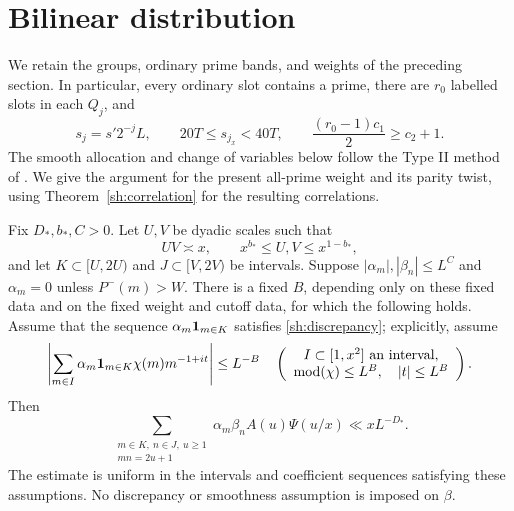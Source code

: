 \section{Bilinear distribution}\label{ti:section}

We retain the groups, ordinary prime bands, and weights of the preceding
section. In particular, every ordinary slot contains a prime, there are
$r_0$ labelled slots in each $Q_j$, and
\[
 s_j=s'2^{-j}L,\qquad 20T\le s_{j_x}<40T,\qquad
 \frac{(r_0-1)c_1}{2}\ge c_2+1.
\]
The smooth allocation and change of variables below follow the Type II
method of \cite{SmoothShifted}. We give the argument for the present
all-prime weight and its parity twist, using
Theorem~\ref{sh:correlation} for the resulting correlations.

\begin{theorem}\label{ti:distribution}
Fix $D_*,b_*,C>0$. Let $U,V$ be dyadic scales such that
\[
 UV\asymp x,\qquad x^{b_*}\le U,V\le x^{1-b_*},
\]
and let $K\subset[U,2U)$ and $J\subset[V,2V)$ be intervals. Suppose
$|\alpha_m|,|\beta_n|\le L^C$ and $\alpha_m=0$ unless
$P^-(m)>W$. There is a fixed $B$, depending only on these fixed data
and on the fixed weight and cutoff data, for which the following holds.
Assume that the sequence $\alpha_m\mathbf{1}_{m\in K}$ satisfies
\eqref{sh:discrepancy}; explicitly, assume
\begin{equation}\label{ti:actual-discrepancy}
 \left|\sum_{m\in I}\alpha_m\mathbf{1}_{m\in K}
                    \chi(m)m^{-1+it}\right|\le L^{-B}
 \quad\left(
 \begin{array}{c}
 I\subset[1,x^2]\text{ an interval},\\
 \operatorname{mod}(\chi)\le L^B,\quad |t|\le L^B
 \end{array}\right).
\end{equation}
Then
\begin{equation}\label{ti:bound}
 \sum_{\substack{m\in K,\ n\in J,\ u\ge1\\mn=2u+1}}
       \alpha_m\beta_n A(u)\Psi(u/x)
       \ll xL^{-D_*}.
\end{equation}
The estimate is uniform in the intervals and coefficient sequences
satisfying these assumptions. No discrepancy or smoothness assumption is
imposed on $\beta$.
\end{theorem}

